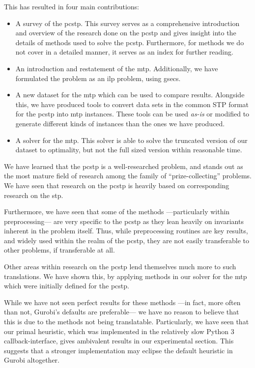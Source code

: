 This has resulted in four main contributions:
\begin{itemize}
\item A survey of the \gls{pcstp}. This survey serves as a comprehensive introduction
  and overview of the research done on the \gls{pcstp} and gives insight into the details of
  methods used to solve the \gls{pcstp}. Furthermore, for methods we do not cover
  in a detailed manner, it serves as an index for further reading.
\item An introduction and restatement of the \gls{mtp}.
  Additionally, we have formulated the problem as an \gls{ilp} problem, using \glspl{gsec}.
\item A new dataset for the \gls{mtp} which can be used to compare results. Alongside
  this, we have produced tools to convert data sets in the common
  STP format for the \gls{pcstp} into \gls{mtp} instances. These tools can be used
  \textit{as-is} or modified to generate different kinds of instances than the ones we have produced.
\item A solver for the \gls{mtp}. This solver is able to solve the truncated version of
  our dataset to optimality, but not the full sized version within reasonable time.
\end{itemize}

\bigskip

We have learned that the \gls{pcstp}
is a well-researched problem, and stands out as the most mature field of
research among the family of ``prize-collecting'' problems.
We have seen that research on the \gls{pcstp} is heavily based on corresponding
research on the \gls{stp}.

Furthermore, we have seen that some of the methods
---particularly within preprocessing---
are very specific to the \gls{pcstp} as they lean heavily on
invariants inherent in the problem itself. Thus, while preprocessing routines
are key results, and widely used within the realm of the \gls{pcstp},
they are not easily transferable to other problems, if transferable at all.

Other areas within research on the \gls{pcstp} lend themselves much more to such
translations. We have shown this, by applying methods in our solver for the \gls{mtp}
which were initially defined for the \gls{pcstp}.

While we have not seen perfect results for these methods
---in fact, more often than not, Gurobi's defaults are preferable---
we have no reason to believe that this is due to the methods not being
translatable. Particularly, we have seen that our primal heuristic,
which was implemented
in the relatively slow Python 3 callback-interface,
gives ambivalent results in our experimental
section. This suggests that a stronger implementation may eclipse the default heuristic
in Gurobi altogether.

